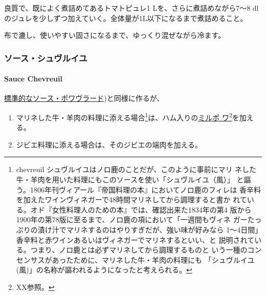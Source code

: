 
良質で、既によく煮詰めてあるトマトピュレ1 Lを、さらに煮詰めながら7〜8
dlのジュレを少しずつ加えていく。全体量が1L以下になるまで煮詰めること。

布で漉し、使いやすい固さになるまで、ゆっくり混ぜながら冷ます。

\maeaki

\hypertarget{ux30bdux30fcux30b9ux30b7ux30e5ux30f4ux30ebux30a4ux30e6}{%
\subsubsection{ソース・シュヴルイユ}\label{ux30bdux30fcux30b9ux30b7ux30e5ux30f4ux30ebux30a4ux30e6}}

\hypertarget{sauce-chevreuil}{%
\paragraph{Sauce Chevreuil}\label{sauce-chevreuil}}

    

\protect\hyperlink{sauce-poivrade}{標準的なソース・ポワヴラード})と同様に作るが、

\begin{enumerate}
\def\labelenumi{\arabic{enumi}.}
\item
  マリネした牛・羊肉の料理に添える場合\footnote{chevreuil
    シュヴルイユはノロ鹿のことだが、このように事前にマリ
    ネした牛・羊肉を用いた料理にもこのソースを使い「シュヴルイユ（風）」
    と謳う。1806年刊ヴィアール『帝国料理の本』においてノロ鹿のフィレは
    香辛料を加えたワインヴィネガーで48時間マリネしてから調理すると書か
    れている。オド『女性料理人のための本』では、確認出来た1834年の第4
    版から1900年の第78版に至るまで、ノロ鹿の項において「一週間もヴィネ
    ガーたっぷりの漬け汁でマリネするのはやりすぎだが、強い味が好みなら
    1〜4日間」香辛料と赤ワインあるいはヴィネガーでマリネするといい、と
    説明されている。つまり、ノロ鹿とは必ずマリネしてから調理するものと
    いう一種のコンセンサスがあったために、マリネした牛・羊肉の料理にも
    「シュヴルイユ(風)」の名称が謳われるようになったと考えられる。}は、ハム入りの\protect\hyperlink{mirepoix}{ミルポ
  ワ}\footnote{XX参照。}を加える。
\item
  ジビエ料理に添える場合は、そのジビエの端肉を加える。
\end{enumerate}

